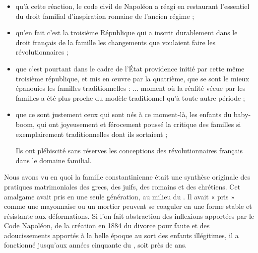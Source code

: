 \begin{itemize}
\item qu'à cette réaction, le code civil de Napoléon a réagi en restaurant l'essentiel du droit familial d'inspiration romaine de l'ancien régime ;
 
\item qu'en fait c'est la troisième République qui a inscrit durablement dans le droit français de la famille les changements que voulaient faire les révolutionnaires ;
 
\item que c'est pourtant dans le cadre de l'État providence initié par cette même troisième république, et mis en œuvre par la quatrième, que se sont le mieux épanouies les familles traditionnelles :  ... moment où la réalité vécue par les familles a été plus proche du modèle traditionnel qu'à toute autre période ;

\item que ce sont justement ceux qui sont nés à ce moment-là, les enfants du baby-boom, qui ont joyeusement et férocement poussé la critique des familles si exemplairement traditionnelles dont ils sortaient ;
 
 Ils ont plébiscité sans réserves les conceptions des révolutionnaires français dans le domaine familial.
 
\end{itemize}
 
 Nous avons vu en quoi la famille constantinienne était une synthèse originale des pratiques matrimoniales des grecs, des juifs, des romains et des chrétiens. Cet amalgame avait pris en une seule génération, au milieu du . Il avait « pris » comme une mayonnaise ou un mortier peuvent se coaguler en une forme stable et résistante aux déformations.  Si l'on fait abstraction des inflexions apportées par le Code Napoléon, de la création en 1884 du divorce pour faute et des adoucissements apportés à la belle époque au sort des enfants illégitimes, il a fonctionné jusqu'aux années cinquante du , soit près de  ans. 
 
